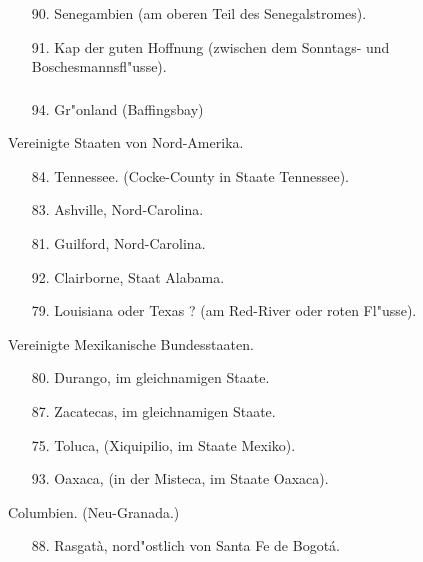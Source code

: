 \documentclass[a4paper, 11pt, oneside, polutonikogreek, german]{article}
\begin{document}
\subsubsection{}
\begin{itemize}
    
    \item[90.] Senegambien (am oberen Teil des Senegalstromes).
    \item[91.] Kap der guten Hoffnung (zwischen dem Sonntags- und Boschesmannsfl"usse).
\end{itemize}
\subsubsection{}
\begin{itemize}
    
    \item[94.] Gr"onland (Baffingsbay)
\end{itemize}
\begin{center}
Vereinigte Staaten von Nord-Amerika.
\end{center}
\begin{itemize}
    
    \item[84.] Tennessee. (Cocke-County in Staate Tennessee).
    \item[83.] Ashville, Nord-Carolina.
    \item[81.] Guilford, Nord-Carolina.
    \item[92.] Clairborne, Staat Alabama.
    \item[79.] Louisiana oder Texas ? (am Red-River oder roten Fl"usse). 
\end{itemize}
\begin{center}
Vereinigte Mexikanische Bundesstaaten.
\end{center}
\begin{itemize}
    
    \item[80.] Durango, im gleichnamigen Staate.
    \item[87.] Zacatecas, im gleichnamigen Staate.
    \item[75.] Toluca, (Xiquipilio, im Staate Mexiko).
    \item[93.] Oaxaca, (in der Misteca, im Staate Oaxaca).
\end{itemize}
\begin{center}
Columbien. (Neu-Granada.)
\end{center}
\begin{itemize}
    
    \item[88.] Rasgatà, nord"ostlich von Santa Fe de Bogotá.
\end{itemize}
\end{document}
